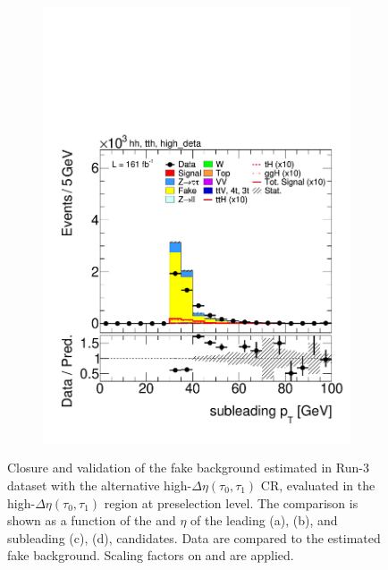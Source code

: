 \begin{figure}[htbp]
\begin{subfigure}[b]{0.45\textwidth}
        \includegraphics[width=\textwidth]{images/highdeta_highdeta_run3/plot_tau_1_pt_hh_tth_22_23_24_high_deta.pdf}
        \caption{}
      \end{subfigure}
      \caption{
    Closure and validation of the fake background estimated in Run-3 dataset with the alternative high-$\Delta \eta (\tau_0, \tau_1)$ \tauhadhad CR, evaluated in the high-$\Delta \eta (\tau_0, \tau_1)$ region at preselection level.
    The comparison is shown as a function of the \pt and $\eta$ of the leading (a), (b), and subleading (c), (d), \tauhad candidates. 
    Data are compared to the estimated fake background. Scaling factors on \ztautau and \ttbar are applied.
  }
  \label{fig:closure_validation_highdeta_run3}
\end{figure}
      

